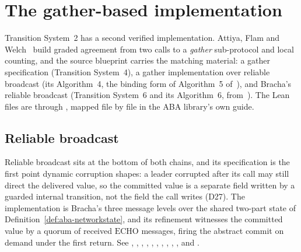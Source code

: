 

\section{The gather-based implementation}
\label{sec:aba-gather}

Transition System~2 has a second verified implementation.
Attiya, Flam and Welch~\cite{AFW25} build graded agreement from two calls to a \emph{gather} sub-protocol and local counting, and the source blueprint carries the matching material: a gather specification (Transition System~4), a gather implementation over reliable broadcast (its Algorithm~4, the binding form of Algorithm~5 of~\cite{AFW25}), and Bracha's reliable broadcast (Transition System~6 and its Algorithm~6, from~\cite{Bra87}).
The Lean files are  through , mapped file by file in the ABA library's own guide.

\subsection{Reliable broadcast}

Reliable broadcast sits at the bottom of both chains, and its specification is the first point dynamic corruption shapes: a leader corrupted after its call may still direct the delivered value, so the committed value is a separate field written by a guarded internal transition, not the field the call writes (D27).
The implementation is Bracha's three message levels over the shared two-part state of Definition~\ref{def:aba-networkstate}, and its refinement witnesses the committed value by a quorum of received $\mathrm{ECHO}$ messages, firing the abstract commit on demand under the first return.
See , , , , , , , , , ,  and .

